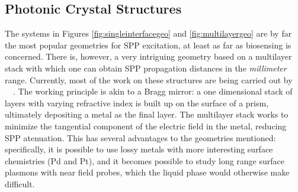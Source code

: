 \subsection{Photonic Crystal Structures}
The systems in Figures \ref{fig:singleinterfacegeo} and
\ref{fig:multilayergeo} are by far the most popular geometries for SPP
excitation, at least as far as biosensing is concerned.  There
is, however, a very intriguing geometry based on a multilayer stack with
which one can obtain SPP propagation distances in the \textit{millimeter}
range.  Currently, most of the work on these structures are being carried
out by ~\cite{konopsky2006long}~\cite{konopsky2009long}.
The working principle is akin to a Bragg mirror: a one dimensional stack of
layers with varying refractive index is built up on the surface of a prism,
ultimately depositing a metal as the final layer.  The multilayer stack
works to minimize the tangential component of the electric field in the
metal, reducing SPP atenuation.  This has several advantages to the
geometries mentioned: specifically, it is possible to use lossy metals with
more interesting surface chemistries (Pd and Pt), and it becomes possible
to study long range surface plasmons with near field probes, which the
liquid phase would otherwise make difficult.
